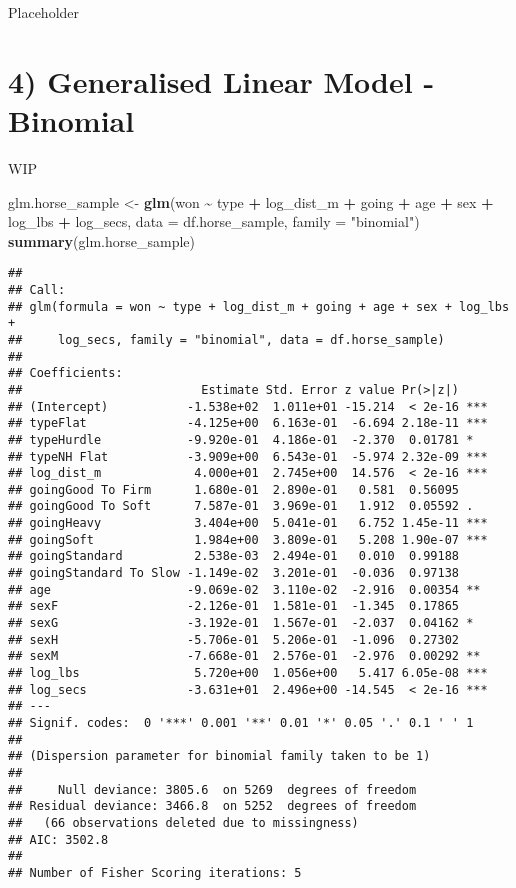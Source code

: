 \documentclass[
]{article}
\newenvironment{Shaded}{\begin{snugshade}}{\end{snugshade}}
\newcommand{\AttributeTok}[1]{\textcolor[rgb]{0.13,0.29,0.53}{#1}}
\newcommand{\FunctionTok}[1]{\textcolor[rgb]{0.13,0.29,0.53}{\textbf{#1}}}
\newcommand{\NormalTok}[1]{#1}
\newcommand{\OtherTok}[1]{\textcolor[rgb]{0.56,0.35,0.01}{#1}}
\newcommand{\SpecialCharTok}[1]{\textcolor[rgb]{0.81,0.36,0.00}{\textbf{#1}}}
\newcommand{\StringTok}[1]{\textcolor[rgb]{0.31,0.60,0.02}{#1}}
\begin{document}
Placeholder

\section{4) Generalised Linear Model -
Binomial}\label{generalised-linear-model---binomial}

WIP

\begin{Shaded}
\begin{Highlighting}[]
\NormalTok{glm.horse\_sample }\OtherTok{\textless{}{-}} \FunctionTok{glm}\NormalTok{(won }\SpecialCharTok{\textasciitilde{}}\NormalTok{ type }\SpecialCharTok{+}\NormalTok{ log\_dist\_m }\SpecialCharTok{+}\NormalTok{ going }\SpecialCharTok{+}\NormalTok{ age }\SpecialCharTok{+}\NormalTok{ sex }\SpecialCharTok{+}\NormalTok{ log\_lbs }\SpecialCharTok{+}\NormalTok{ log\_secs, }
                \AttributeTok{data =}\NormalTok{ df.horse\_sample,}
                \AttributeTok{family =} \StringTok{"binomial"}\NormalTok{)}
\FunctionTok{summary}\NormalTok{(glm.horse\_sample)}
\end{Highlighting}
\end{Shaded}

\begin{verbatim}
## 
## Call:
## glm(formula = won ~ type + log_dist_m + going + age + sex + log_lbs + 
##     log_secs, family = "binomial", data = df.horse_sample)
## 
## Coefficients:
##                         Estimate Std. Error z value Pr(>|z|)    
## (Intercept)           -1.538e+02  1.011e+01 -15.214  < 2e-16 ***
## typeFlat              -4.125e+00  6.163e-01  -6.694 2.18e-11 ***
## typeHurdle            -9.920e-01  4.186e-01  -2.370  0.01781 *  
## typeNH Flat           -3.909e+00  6.543e-01  -5.974 2.32e-09 ***
## log_dist_m             4.000e+01  2.745e+00  14.576  < 2e-16 ***
## goingGood To Firm      1.680e-01  2.890e-01   0.581  0.56095    
## goingGood To Soft      7.587e-01  3.969e-01   1.912  0.05592 .  
## goingHeavy             3.404e+00  5.041e-01   6.752 1.45e-11 ***
## goingSoft              1.984e+00  3.809e-01   5.208 1.90e-07 ***
## goingStandard          2.538e-03  2.494e-01   0.010  0.99188    
## goingStandard To Slow -1.149e-02  3.201e-01  -0.036  0.97138    
## age                   -9.069e-02  3.110e-02  -2.916  0.00354 ** 
## sexF                  -2.126e-01  1.581e-01  -1.345  0.17865    
## sexG                  -3.192e-01  1.567e-01  -2.037  0.04162 *  
## sexH                  -5.706e-01  5.206e-01  -1.096  0.27302    
## sexM                  -7.668e-01  2.576e-01  -2.976  0.00292 ** 
## log_lbs                5.720e+00  1.056e+00   5.417 6.05e-08 ***
## log_secs              -3.631e+01  2.496e+00 -14.545  < 2e-16 ***
## ---
## Signif. codes:  0 '***' 0.001 '**' 0.01 '*' 0.05 '.' 0.1 ' ' 1
## 
## (Dispersion parameter for binomial family taken to be 1)
## 
##     Null deviance: 3805.6  on 5269  degrees of freedom
## Residual deviance: 3466.8  on 5252  degrees of freedom
##   (66 observations deleted due to missingness)
## AIC: 3502.8
## 
## Number of Fisher Scoring iterations: 5
\end{verbatim}
\end{document}

